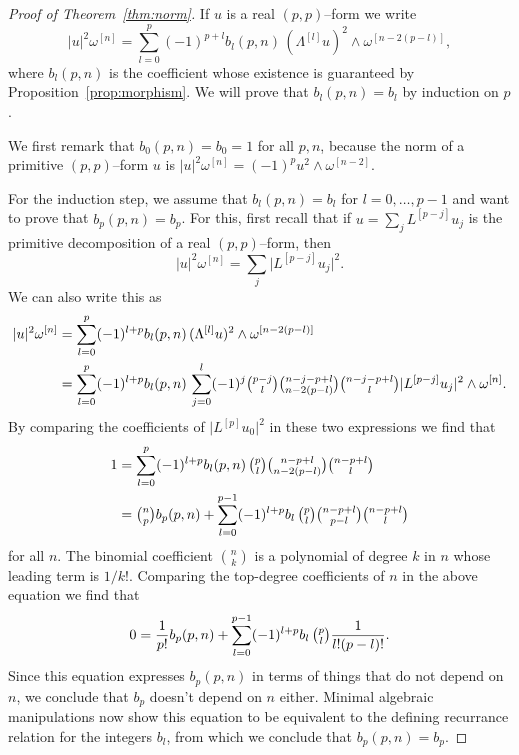 \documentclass[11pt,a4paper]{amsart}
\def\^#1{^{[#1]}}
\theoremstyle{definition}
\numberwithin{equation}{section}
\begin{document}
\begin{proof}[Proof of Theorem~\ref{thm:norm}]
    If $u$ is a real $(p,p)$--form we write
    $$
    \lvert u \rvert^2 \omega\^n
    = \sum_{l=0}^p (-1)^{p+l} b_l(p,n) \, 
    (\Lambda\^l u)^2 \wedge \omega\^{n-2(p-l)},
    $$
where $b_l(p,n)$ is the coefficient whose existence is guaranteed by
Proposition~\ref{prop:morphism}.  We will prove that $b_l(p,n) = b_l$ by
induction on $p$. 

We first remark that $b_0(p,n) = b_0 = 1$ for all $p, n$, because
the norm of a primitive $(p,p)$--form $u$ is $\lvert u \rvert^2 \omega\^n =
(-1)^p u^2 \wedge \omega\^{n-2}$.


For the induction step, we assume that $b_l(p,n) = b_l$ for $l = 0, \ldots,
p-1$ and want to prove that $b_{p}(p,n) = b_{p}$. For this, first
recall that if $u = \sum_j L\^{p-j} u_j$ is the primitive decomposition of
a real $(p,p)$--form, then 
$$
\lvert u \rvert^2 \omega\^n 
= \sum_j \lvert L\^{p-j} u_j \rvert^2.
$$ 
We can also write this as
\begin{align*}
\lvert u \rvert^2 \omega\^n 
&= \sum_{l=0}^p (-1)^{l+p} b_l(p,n) \, 
(\Lambda\^{l} u)^2 \wedge \omega\^{n-2(p-l)}
\\
&= \sum_{l=0}^p (-1)^{l+p} b_l(p,n) \, 
\sum_{j=0}^l 
(-1)^j
  \tbinom{p-j}{l}
  \tbinom{n-j-p+l}{n-2(p-l)}
  \tbinom{n-j-p+l}{l}
  \lvert L\^{p-j} u_j \rvert^2
  \wedge \omega\^ n.
\end{align*}
By comparing the coefficients of $\lvert L\^p u_0 \rvert^2$ in these
two expressions we find that
\begin{align*}
1 &= 
\sum_{l=0}^p (-1)^{l+p} b_l(p,n) \, 
\tbinom{p}{l}
\tbinom{n-p+l}{n-2(p-l)}
\tbinom{n-p+l}{l}
\\
&= \tbinom{n}{p} b_p(p,n)
+ \sum_{l=0}^{p-1} (-1)^{l+p} b_l \, 
\tbinom{p}{l}
\tbinom{n-p+l}{p-l}
\tbinom{n-p+l}{l}
\end{align*}
for all $n$. The binomial coefficient $\binom{n}{k}$ is a polynomial of
degree $k$ in $n$ whose leading term is $1/k!$. Comparing the top-degree
coefficients of $n$ in the above equation we find that
$$
0 =
\frac{1}{p!} b_p(p,n)
+ \sum_{l=0}^{p-1} (-1)^{l+p} b_l \, 
\tbinom{p}{l}
\frac{1}{l! (p-l)!}.
$$
Since this equation expresses $b_p(p,n)$ in terms of things that do not
depend on $n$, we conclude that $b_p$ doesn't depend on $n$ either.
Minimal algebraic manipulations now show this equation to be equivalent to
the defining recurrance relation for the integers $b_l$, from which we
conclude that $b_p(p,n) = b_p$.
\end{proof}
\end{document}

